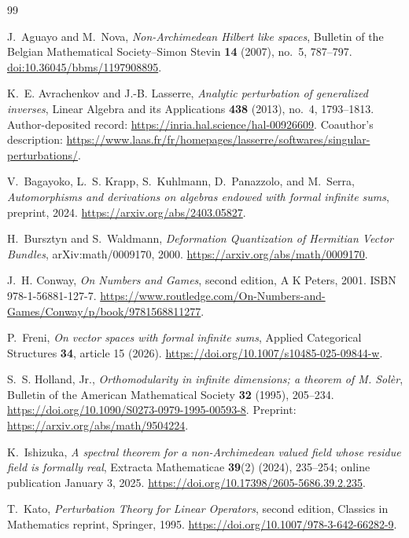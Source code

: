 \documentclass[11pt,letterpaper]{article}
\numberwithin{equation}{section}
\theoremstyle{definition}
\theoremstyle{remark}
\begin{document}
\clearpage
\begin{thebibliography}{99}

J.~Aguayo and M.~Nova,
\emph{Non-Archimedean Hilbert like spaces},
Bulletin of the Belgian Mathematical Society--Simon Stevin
\textbf{14} (2007), no.~5, 787--797.
\href{https://doi.org/10.36045/bbms/1197908895}{doi:10.36045/bbms/1197908895}.

K.~E. Avrachenkov and J.-B. Lasserre,
\emph{Analytic perturbation of generalized inverses},
Linear Algebra and its Applications \textbf{438} (2013), no.~4,
1793--1813. Author-deposited record:
\url{https://inria.hal.science/hal-00926609}.
Coauthor's description:
\url{https://www.laas.fr/fr/homepages/lasserre/softwares/singular-perturbations/}.

V.~Bagayoko, L.~S. Krapp, S.~Kuhlmann, D.~Panazzolo, and M.~Serra,
\emph{Automorphisms and derivations on algebras endowed with formal
infinite sums}, preprint, 2024.
\url{https://arxiv.org/abs/2403.05827}.

H.~Bursztyn and S.~Waldmann,
\emph{Deformation Quantization of Hermitian Vector Bundles},
arXiv:math/0009170, 2000.
\url{https://arxiv.org/abs/math/0009170}.

J.~H. Conway,
\emph{On Numbers and Games}, second edition,
A K Peters, 2001. ISBN 978-1-56881-127-7.
\url{https://www.routledge.com/On-Numbers-and-Games/Conway/p/book/9781568811277}.

P.~Freni, \emph{On vector spaces with formal infinite sums},
Applied Categorical Structures \textbf{34}, article 15 (2026).
\url{https://doi.org/10.1007/s10485-025-09844-w}.

S.~S. Holland, Jr., \emph{Orthomodularity in infinite dimensions;
a theorem of M. Sol\`er},
Bulletin of the American Mathematical Society \textbf{32} (1995), 205--234.
\url{https://doi.org/10.1090/S0273-0979-1995-00593-8}.
Preprint: \url{https://arxiv.org/abs/math/9504224}.

K.~Ishizuka, \emph{A spectral theorem for a non-Archimedean valued field
whose residue field is formally real},
Extracta Mathematicae \textbf{39}(2) (2024), 235--254;
online publication January 3, 2025.
\url{https://doi.org/10.17398/2605-5686.39.2.235}.

T.~Kato, \emph{Perturbation Theory for Linear Operators},
second edition, Classics in Mathematics reprint, Springer, 1995.
\url{https://doi.org/10.1007/978-3-642-66282-9}.


\end{thebibliography}
\end{document}
